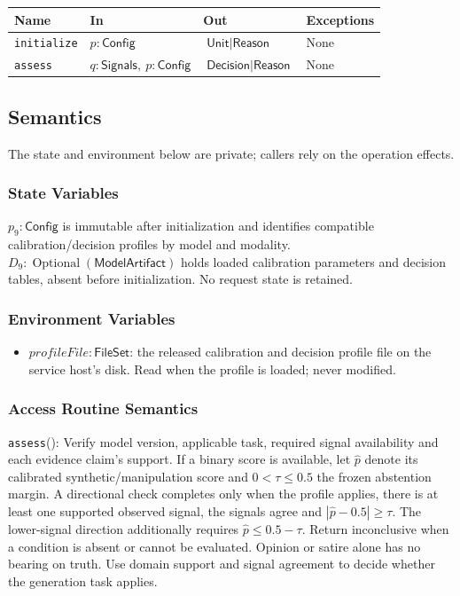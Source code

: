 \documentclass[12pt, titlepage]{article}
\newcommand{\ty}[1]{\textsf{#1}}
\begin{document}
\begin{center}
\begin{tabular}{p{3.3cm} p{4cm} p{4cm} p{2.4cm}}
\hline
\textbf{Name} & \textbf{In} & \textbf{Out} & \textbf{Exceptions} \\
\hline
\texttt{initialize} & $p:\ty{Config}$ & $\ty{Unit}\mid\ty{Reason}$ & None \\
\texttt{assess} & $q:\ty{Signals},\ p:\ty{Config}$ & $\ty{Decision}\mid\ty{Reason}$ & None \\
\hline
\end{tabular}
\end{center}

\subsection{Semantics}

The state and environment below are private; callers rely on the operation effects.

\subsubsection{State Variables}

$p_9:\ty{Config}$ is immutable after initialization and identifies compatible calibration/decision profiles by model and modality. $D_9:\operatorname{Optional}(\ty{ModelArtifact})$ holds loaded calibration parameters and decision tables, absent before initialization. No request state is retained.

\subsubsection{Environment Variables}

\begin{itemize}
\item $\mathit{profileFile}:\ty{FileSet}$: the released calibration and decision profile file on the service host's disk. Read when the profile is loaded; never modified.
\end{itemize}

\subsubsection{Access Routine Semantics}

\noindent \texttt{assess}():
Verify model version, applicable task, required signal availability and each evidence claim's support. If a binary score is available, let $\hat p$ denote its calibrated synthetic/manipulation score and $0<\tau\le0.5$ the frozen abstention margin. A directional check completes only when the profile applies, there is at least one supported observed signal, the signals agree and $|\hat p-0.5|\ge\tau$. The lower-signal direction additionally requires $\hat p\le0.5-\tau$. Return inconclusive when a condition is absent or cannot be evaluated. Opinion or satire alone has no bearing on truth. Use domain support and signal agreement to decide whether the generation task applies.
\end{document}
